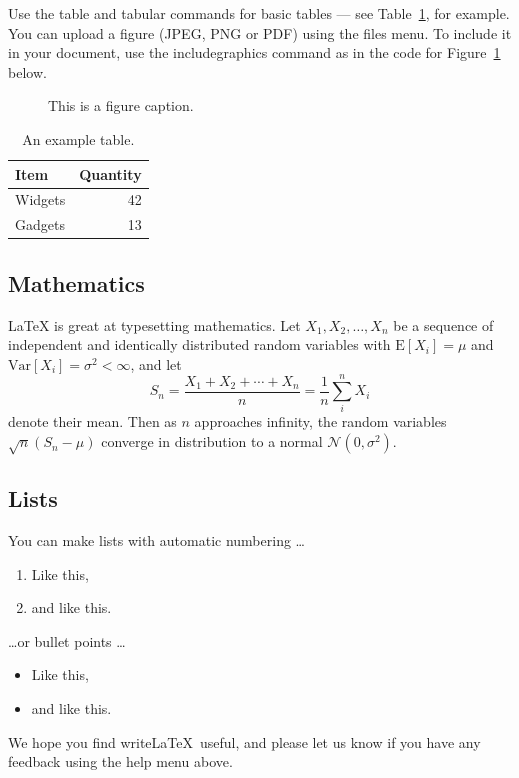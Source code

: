 \documentclass[a4paper,12pt]{article}
\begin{document}
Use the table and tabular commands for basic tables --- see Table~\ref{tab:widgets}, for example. You can upload a figure (JPEG, PNG or PDF) using the files menu. To include it in your document, use the includegraphics command as in the code for Figure~\ref{fig:frog} below.

\begin{figure}
\centering
\caption{\label{fig:frog}This is a figure caption.}
\end{figure}

\begin{table}
\centering
\begin{tabular}{l|r}
Item & Quantity \\\hline
Widgets & 42 \\
Gadgets & 13
\end{tabular}
\caption{\label{tab:widgets}An example table.}
\end{table}

\subsection{Mathematics}

\LaTeX{} is great at typesetting mathematics. Let $X_1, X_2, \ldots, X_n$ be a sequence of independent and identically distributed random variables with $\text{E}[X_i] = \mu$ and $\text{Var}[X_i] = \sigma^2 < \infty$, and let
$$S_n = \frac{X_1 + X_2 + \cdots + X_n}{n}
      = \frac{1}{n}\sum_{i}^{n} X_i$$
denote their mean. Then as $n$ approaches infinity, the random variables $\sqrt{n}(S_n - \mu)$ converge in distribution to a normal $\mathcal{N}(0, \sigma^2)$.

\subsection{Lists}

You can make lists with automatic numbering \dots

\begin{enumerate}
\item Like this,
\item and like this.
\end{enumerate}
\dots or bullet points \dots
\begin{itemize}
\item Like this,
\item and like this.
\end{itemize}

We hope you find write\LaTeX\ useful, and please let us know if you have any feedback using the help menu above.
\end{document}
